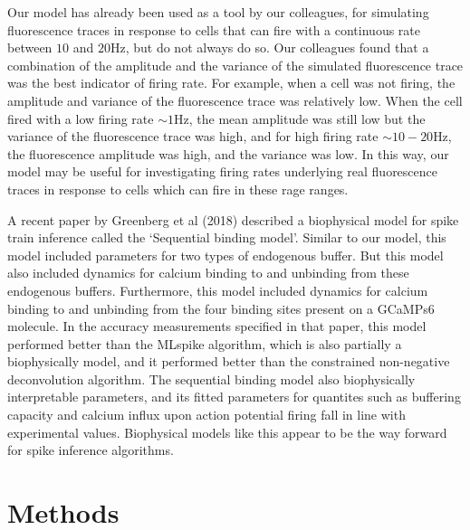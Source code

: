 \documentclass[a4paper,12pt]{article}
\theoremstyle{definition}
\begin{document}
Our model has already been used as a tool by our colleagues, for simulating fluorescence traces in response to cells that can fire with a continuous rate between $10$ and $20$Hz, but do not always do so. Our colleagues found that a combination of the amplitude and the variance of the simulated fluorescence trace was the best indicator of firing rate. For example, when a cell was not firing, the amplitude and variance of the fluorescence trace was relatively low. When the cell fired with a low firing rate $\sim 1$Hz, the mean amplitude was still low but the variance of the fluorescence trace was high, and for high firing rate $\sim 10-20$Hz, the fluorescence amplitude was high, and the variance was low. In this way, our model may be useful for investigating firing rates underlying real fluorescence traces in response to cells which can fire in these rage ranges.

A recent paper by Greenberg et al (2018) described a biophysical model for spike train inference called the `Sequential binding model'. Similar to our model, this model included parameters for two types of endogenous buffer. But this model also included dynamics for calcium binding to and unbinding from these endogenous buffers. Furthermore, this model included dynamics for calcium binding to and unbinding from the four binding sites present on a GCaMPs6 molecule. In the accuracy measurements specified in that paper, this model performed better than the MLspike algorithm, which is also partially a biophysically model, and it performed better than the constrained non-negative deconvolution algorithm. The sequential binding model also biophysically interpretable parameters, and its fitted parameters for quantites such as buffering capacity and calcium influx upon action potential firing fall in line with experimental values\cite{greenberg}. Biophysical models like this appear to be the way forward for spike inference algorithms.

\section{Methods}
\end{document}
